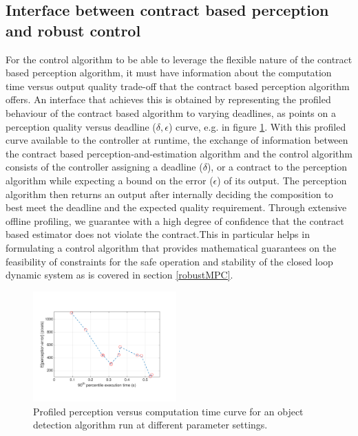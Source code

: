 
\subsection{Interface between contract based perception and robust control}

For the control algorithm to be able to leverage the flexible nature of the contract based perception algorithm, it must have information about the computation time versus output quality trade-off that the contract based perception algorithm offers. An interface that achieves this is obtained by representing the profiled behaviour of the contract based algorithm to varying deadlines, as points on a perception quality versus deadline ($\delta, \epsilon$) curve, e.g. in figure \ref{fig:eps_delta_toy}.
With this profiled curve available to the controller at runtime, the exchange of information between the contract based perception-and-estimation algorithm and the control algorithm consists of the controller assigning a deadline ($\delta$), or a contract to the perception algorithm while expecting a bound on the error ($\epsilon$) of its output. The perception algorithm then returns an output after internally deciding the composition to best meet the deadline and the expected quality requirement. 
Through extensive offline profiling, we guarantee with a high degree of confidence that the contract based estimator does not violate the contract.This in particular helps in formulating a control algorithm that provides mathematical guarantees on the feasibility of constraints for the safe operation and stability of the closed loop dynamic system as is covered in section \ref{robustMPC}.

\begin{figure}[t]
	\centering
	\includegraphics[width=0.49\textwidth]{figures/chainErrorDelay}
	\caption{Profiled perception versus computation time curve for an object detection algorithm run at different parameter settings.}
	\label{fig:eps_delta_toy}
\end{figure}

